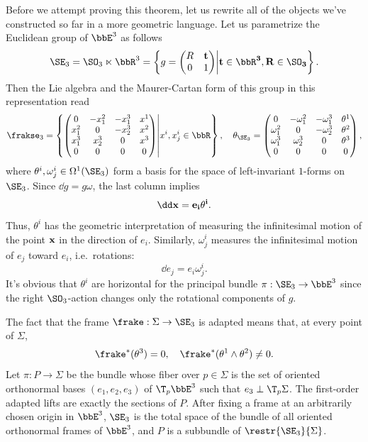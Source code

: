 Before we attempt proving this theorem, let us rewrite all of the objects we've constructed so far in a more geometric language.
Let us parametrize the Euclidean group of $\bbE^3$ as follows 
\[\SE_3=\SO_3\ltimes\bbR^3=\left\{g=\begin{pmatrix}
    R & \bf{t}\\
    0 & 1
\end{pmatrix}\middle| \bf{t}\in\bbR^3,R\in\SO_3
\right\}.\]
Then the Lie algebra and the Maurer-Cartan form of this group in this representation read
\[ \frakse_3=\left\{\begin{pmatrix}
    0 & -x_1^2 & -x_1^3& x^1\\
    x_1^2 & 0 & -x_2^3 & x^2\\
    x_1^3 & x_2^3 & 0 & x^3\\
    0 & 0& 0& 0
\end{pmatrix}\middle| x^i,x^i_j\in\bbR\right\},
\quad
\theta_{\SE_3}=
    \begin{pmatrix}
        0 & -\omega_1^2 & -\omega_1^3& \theta^1\\
        \omega_1^2 & 0 & -\omega_2^3 & \theta^2\\
        \omega_1^3 & \omega_2^3 & 0 & \theta^3\\
        0 & 0& 0& 0
    \end{pmatrix},
\]
where $\theta^i,\omega^i_j\in\Omega^1(\SE_3)$ form a basis for the space of left-invariant $1$-forms on $\SE_3$. Since $\dd g=g\omega$, the last column implies 
\[\dd \bf{x}=e_i\theta^i.\]
Thus, $\theta^i$ has the geometric interpretation of measuring the infinitesimal motion of the point $\bf{x}$ in the direction of $e_i$. Similarly, $\omega^i_j$ measures the infinitesimal motion of $e_j$ toward $e_i$, i.e.\ rotations:
\[\dd e_j=e_i\omega^i_j.\]
It's obvious that $\theta^i$ are horizontal for the principal bundle $\pi:\SE_3\to\bbE^3$ since the right $\SO_3$-action changes only the rotational components of $g$.

The fact that the frame $\frake:\Sigma\to \SE_3$ is adapted means that, at every point of $\Sigma$,
\[\frake^\ast(\theta^3)=0,\quad \frake^\ast(\theta^1\wedge\theta^2)\neq 0.\label{eq 2.2 Ivey}\]
Let $\pi:P\to \Sigma$ be the bundle whose fiber over $p\in\Sigma$ is the set of oriented orthonormal bases $(e_1,e_2,e_3)$ of $\T_p \bbE^3$ such that $e_3\perp \T_p\Sigma$. The first-order adapted lifts are exactly the sections of $P$. After fixing a frame at an arbitrarily chosen origin in $\bbE^3$, $\SE_3$ is the total space of the bundle of all oriented orthonormal frames of $\bbE^3$, and $P$ is a subbundle of $\restr{\SE_3}{\Sigma}$.

